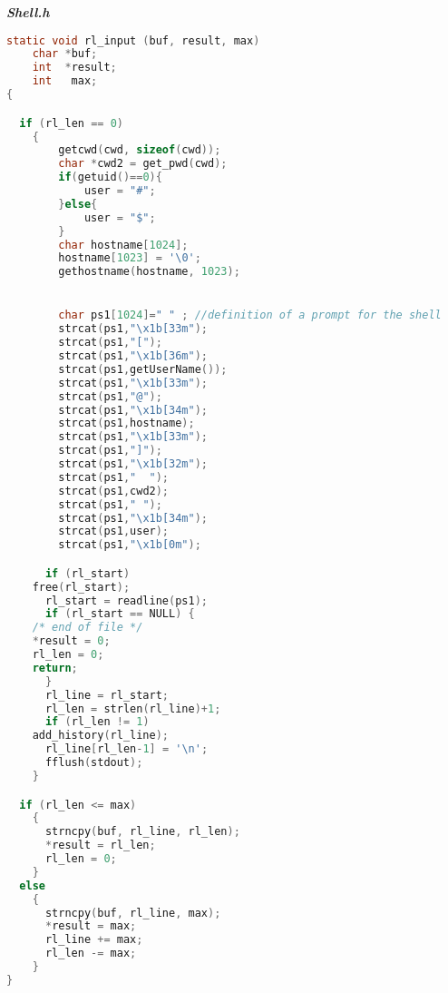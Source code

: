 \documentclass[paper=a4, fontsize=11pt]{scrartcl}
\numberwithin{equation}{section}		%
\numberwithin{figure}{section}			%
\numberwithin{table}{section}				%
\begin{document}
\textbf{\emph{Shell.h}}
\begin{lstlisting}[language=c]
static void rl_input (buf, result, max)
	char *buf;
	int  *result;
	int   max;
{

  if (rl_len == 0)
    {
		getcwd(cwd, sizeof(cwd));
        char *cwd2 = get_pwd(cwd);
		if(getuid()==0){
			user = "#";
		}else{
			user = "$";
		}
        char hostname[1024];
        hostname[1023] = '\0';
        gethostname(hostname, 1023);


		char ps1[1024]=" " ; //definition of a prompt for the shell
		strcat(ps1,"\x1b[33m");
		strcat(ps1,"[");
		strcat(ps1,"\x1b[36m");
		strcat(ps1,getUserName());
		strcat(ps1,"\x1b[33m");
		strcat(ps1,"@");
		strcat(ps1,"\x1b[34m");
		strcat(ps1,hostname);
		strcat(ps1,"\x1b[33m");
		strcat(ps1,"]");
		strcat(ps1,"\x1b[32m");
		strcat(ps1,"  ");
		strcat(ps1,cwd2);
		strcat(ps1," ");
		strcat(ps1,"\x1b[34m");
		strcat(ps1,user);
		strcat(ps1,"\x1b[0m");

      if (rl_start)
	free(rl_start);
      rl_start = readline(ps1);
      if (rl_start == NULL) {
	/* end of file */
	*result = 0;
	rl_len = 0;
	return;
      }
      rl_line = rl_start;
      rl_len = strlen(rl_line)+1;
      if (rl_len != 1)
	add_history(rl_line); 
      rl_line[rl_len-1] = '\n';
      fflush(stdout);
    }

  if (rl_len <= max)
    {
      strncpy(buf, rl_line, rl_len);
      *result = rl_len;
      rl_len = 0;
    }
  else
    {
      strncpy(buf, rl_line, max);
      *result = max;
      rl_line += max;
      rl_len -= max;
    }
}

\end{lstlisting}



 
\end{document}
